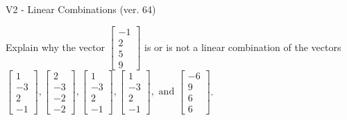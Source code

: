 \begin{exercise}
  \begin{exerciseTitle}V2 - Linear Combinations (ver. 64)\end{exerciseTitle}
  \begin{exerciseStatement}
    Explain why the vector \(\left[\begin{array}{c}
-1 \\
2 \\
5 \\
9
\end{array}\right]\)  is or is not a linear 
	combination of the vectors \(\left[\begin{array}{c}
1 \\
-3 \\
2 \\
-1
\end{array}\right] , \left[\begin{array}{c}
2 \\
-3 \\
-2 \\
-2
\end{array}\right] , \left[\begin{array}{c}
1 \\
-3 \\
2 \\
-1
\end{array}\right] , \left[\begin{array}{c}
1 \\
-3 \\
2 \\
-1
\end{array}\right] , \text{ and } \left[\begin{array}{c}
-6 \\
9 \\
6 \\
6
\end{array}\right]\).
	



\end{exerciseStatement}
\end{exercise}
